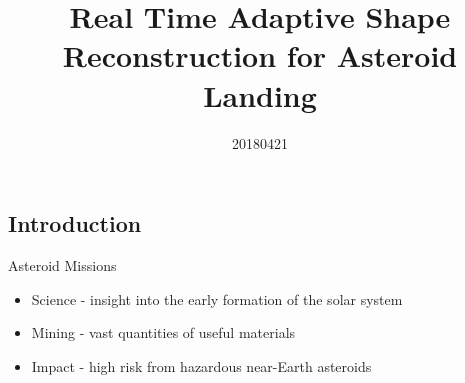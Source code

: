 \documentclass[11pt,professionalfonts]{beamer}
\title[Asteroid Reconstruction]{\large\textbf Real Time Adaptive Shape Reconstruction for Asteroid Landing}
\author{\vspace*{-0.3cm}}
\institute{
	\footnotesize
	{\normalsize\bf{Shankar Kulumani}}\\
	\vspace*{0.2cm}
  	\textbf{Department of Mechanical \& Aerospace Engineering}\\ \vspace*{0.5cm}
 	\begin{figure} %
       	\texttt{[image: gw\_txh\_2cs\_pos]}
  	\end{figure}
}
\date{20180421}
\begin{document}

\setcounter{framenumber}{-1}
\begin{frame} %
  \titlepage
\end{frame}   %

\section*{}
\subsection*{Introduction}  
\begin{frame}{Asteroid Missions}
\begin{itemize}
    \item<1-> Science - insight into the early formation of the solar system
    \item<2-> Mining - vast quantities of useful materials
    \item<3-> Impact - high risk from hazardous near-Earth asteroids
\end{itemize}    

\end{frame}
\end{document}
